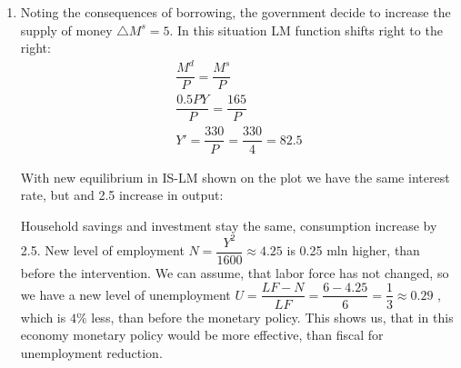 \documentclass[a4paper,12pt]{article} %
\begin{document}
\begin{enumerate}[label=\alph*)]
\item  Noting the consequences of borrowing, the government decide to increase the supply of money
$ \bigtriangleup M^{s} = 5 $. In this situation LM function shifts right to the right:
\begin{gather*}
\dfrac{M^{d}}{P} = \dfrac{M^{s}}{P} \\
\dfrac{0.5PY}{P} = \dfrac{165}{P} \\
Y'=\dfrac{330}{P} = \dfrac{330}{4} = 82.5
\end{gather*}


With new equilibrium in IS-LM shown on the plot we have the same interest rate, but and 2.5 increase in output: 


Household savings and investment stay the same, consumption increase by 2.5.  
New level of employment $ N = \dfrac{Y^{2}}{1600} \approx 4.25  $  is 0.25 mln higher, than before the intervention. We can assume, that labor force has not changed, so we have a new level of unemployment $ U = \dfrac{LF - N}{LF} = \dfrac{6-4.25}{6}= \dfrac{1}{3}\approx 0.29$ , which is $ 4\% $ less, than before the monetary policy.
 This  shows us, that in this economy monetary policy would be more effective, than fiscal  for unemployment reduction.



\end{enumerate}
\end{document}
